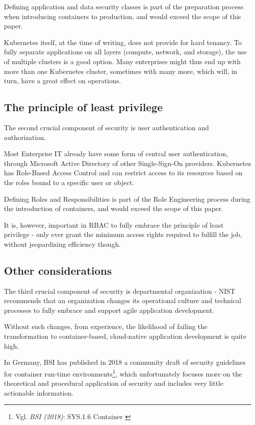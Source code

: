Defining application and data security classes is part of the preparation process when introducing containers to production, and would exceed the scope of this paper.

Kubernetes itself, at the time of writing, does not provide for hard tenancy. To fully separate applications on all layers (compute, network, and storage), the use of multiple clusters is a good option. Many enterprises might thus end up with more than one Kubernetes cluster, sometimes with many more, which will, in turn, have a great effect on operations.

\subsection{The principle of least privilege}

The second crucial component of security is user authentication and authorization.

Most Enterprise IT already have some form of central user authentication, through Microsoft Active Directory of other Single-Sign-On providers. Kubernetes has Role-Based Access Control and can restrict access to its resources based on the roles bound to a specific user or object.

Defining Roles and Responsibilities is part of the Role Engineering process during the introduction of containers, and would exceed the scope of this paper.

It is, however, important in RBAC to fully embrace the principle of least privilege - only ever grant the minimum access rights required to fulfill the job, without jeopardizing efficiency though.

\subsection{Other considerations}

The third crucial component of security is departmental organization - NIST recommends that an organization changes its operational culture and technical processes to fully embrace and support agile application development.

Without such changes, from experience, the likelihood of failing the transformation to container-based, cloud-native application development is quite high.

In Germany, BSI has published in 2018 a community draft of security guidelines for container run-time environments\footnote{Vgl. \textit{BSI (2018)}: SYS.1.6 Container \cite{sys16Container}}, which unfortunately focuses more on the theoretical and procedural application of security and includes very little actionable information.

